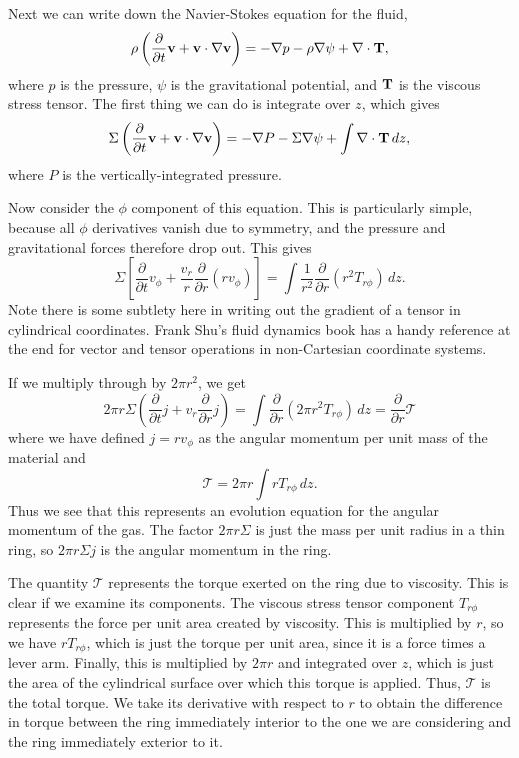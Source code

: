 Next we can write down the Navier-Stokes equation for the fluid,
\begin{equation}
\rho\left(\frac{\partial}{\partial t}\mathbf{v} + \mathbf{v}\cdot\nabla\mathbf{v}\right) = -\nabla p - \rho\nabla\psi + \nabla\cdot \mathbf{T},
\end{equation}
where $p$ is the pressure, $\psi$ is the gravitational potential, and $\mathbf{T}$ is the viscous stress tensor. The first thing we can do is integrate over $z$, which gives
\begin{equation}
\Sigma \left(\frac{\partial}{\partial t}\mathbf{v} + \mathbf{v}\cdot\nabla\mathbf{v}\right) = -\nabla P - \Sigma \nabla\psi + \int \nabla\cdot \mathbf{T}\,dz,
\end{equation}
where $P$ is the vertically-integrated pressure.

Now consider the $\phi$ component of this equation. This is particularly simple, because all $\phi$ derivatives vanish due to symmetry, and the pressure and gravitational forces therefore drop out. This gives
\begin{equation}
\Sigma \left[\frac{\partial}{\partial t} v_\phi + \frac{v_r}{r} \frac{\partial}{\partial r}(rv_\phi)\right] = \int \frac{1}{r^2} \frac{\partial}{\partial r}(r^ 2 T_{r\phi})\,dz.
\end{equation}
Note there is some subtlety here in writing out the gradient of a tensor in cylindrical coordinates. Frank Shu's fluid dynamics book has a handy reference at the end for vector and tensor operations in non-Cartesian coordinate systems.

If we multiply through by $2\pi r^2$, we get
\begin{equation}
2\pi r \Sigma \left(\frac{\partial}{\partial t} j + v_r \frac{\partial}{\partial r}j\right) = \int \frac{\partial}{\partial r}(2\pi r^ 2 T_{r\phi})\,dz = \frac{\partial}{\partial r} \mathcal{T}
\end{equation}
where we have defined $j=rv_\phi$ as the angular momentum per unit mass of the material and
\begin{equation}
\mathcal{T} = 2\pi r \int r T_{r\phi}\, dz.
\end{equation}
Thus we see that this represents an evolution equation for the angular momentum of the gas. The factor $2\pi r \Sigma$ is just the mass per unit radius in a thin ring, so $2\pi r\Sigma j$ is the angular momentum in the ring.

The quantity $\mathcal{T}$ represents the torque exerted on the ring due to viscosity. This is clear if we examine its components. The viscous stress tensor component $T_{r\phi}$ represents the force per unit area created by viscosity. This is multiplied by $r$, so we have $rT_{r\phi}$, which is just the torque per unit area, since it is a force times a lever arm. Finally, this is multiplied by $2\pi r$ and integrated over $z$, which is just the area of the cylindrical surface over which this torque is applied. Thus, $\mathcal{T}$ is the total torque. We take its derivative with respect to $r$ to obtain the difference in torque between the ring immediately interior to the one we are considering and the ring immediately exterior to it. 

